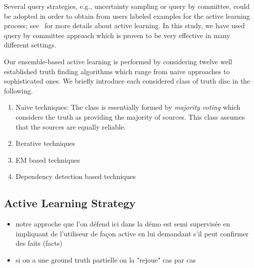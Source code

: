 Several query strategies, e.g., uncertainty sampling or query by committee, could be adopted in order to obtain from users labeled
examples for the active learning process; see~\cite{burr12} for more details about active learning. In this study, we have used query 
by committee approach which is proven to be very effective in many different settings.



Our ensemble-based active learning is performed by considering twelve well established truth finding algorithms which range from naive approaches
to sophisticated ones. We briefly introduce each considered class of truth disc in the following.

\begin{enumerate}
 \item Naive techniques: The class is essentially formed by \emph{majority voting} which considers the truth as providing the majority of 
sources. This class assumes that the sources are equally reliable.
 \item Iterative techniques
 \item EM based techniques
 \item Dependency detection based techniques
\end{enumerate}



\subsection{Active Learning Strategy}
\begin{itemize}
 \item notre approche que l'on défend ici dans la démo est  semi supervisée en impliquant de l'utiliseur de façon active
en lui demandant s'il peut confirmer des faits (facts)
\item si on a une ground truth partielle on la "rejoue" cas par cas
\end{itemize}

